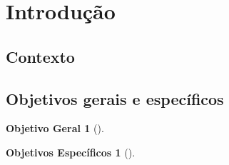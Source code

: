 


\section{Introdução}
\subsection{Contexto}
\begin{frame}\justifying
	\begin{itemize}
	\end{itemize}
\end{frame}

\subsection{Objetivos gerais e específicos}
\begin{frame}\justifying
	\newtheorem{mur}{Objetivo Geral}
	\begin{mur}[]
		\justifying
		\normalsize{}\newline
	\end{mur}
\end{frame}

\begin{frame}\justifying
	\newtheorem{mur2}{Objetivos Específicos}
	\begin{mur2}[]
		\justifying
		
	\end{mur2}
\end{frame}




